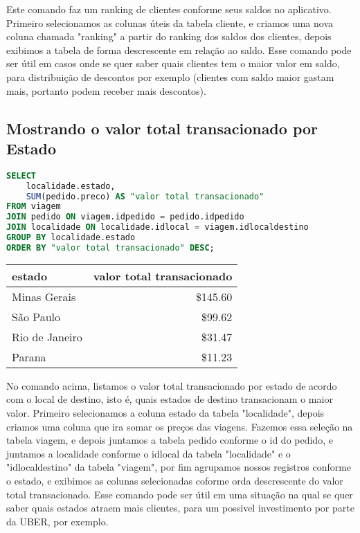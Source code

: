 \documentclass{article}
\begin{document}
Este comando faz um ranking de clientes conforme seus saldos no aplicativo. Primeiro selecionamos as colunas úteis da tabela cliente, e criamos uma nova coluna chamada "ranking" a partir do ranking dos saldos dos clientes, depois exibimos a tabela de forma descrescente em relação ao saldo. Esse comando pode ser útil em casos onde se quer saber quais clientes tem o maior valor em saldo, para distribuição de descontos por exemplo (clientes com saldo maior gastam mais, portanto podem receber mais descontos).

\break

\subsection{Mostrando o valor total transacionado por Estado}

\begin{lstlisting}[language=SQL]
SELECT 
    localidade.estado, 
    SUM(pedido.preco) AS "valor total transacionado"
FROM viagem
JOIN pedido ON viagem.idpedido = pedido.idpedido
JOIN localidade ON localidade.idlocal = viagem.idlocaldestino
GROUP BY localidade.estado
ORDER BY "valor total transacionado" DESC;
\end{lstlisting}

\begin{table}[h]
    \centering
    \begin{tabular}{l|r}
    
    \textbf{estado} & \textbf{valor total transacionado} \\
    \hline

    Minas Gerais    &                   \$145.60  \\
    São Paulo       &                   \$99.62   \\
    Rio de Janeiro  &                   \$31.47   \\
    Parana          &                   \$11.23 
    
\end{tabular}
\end{table}

No comando acima, listamos o valor total transacionado por estado de acordo com o local de destino, isto é, quais estados de destino transacionam o maior valor. Primeiro selecionamos a coluna estado da tabela "localidade", depois criamos uma coluna que ira somar os preços das viagens. Fazemos essa seleção na tabela viagem, e depois juntamos a tabela pedido conforme o id do pedido, e juntamos a localidade conforme o idlocal da tabela "localidade" e o "idlocaldestino" da tabela "viagem", por fim agrupamos nossos registros conforme o estado, e exibimos as colunas selecionadas coforme orda descrescente do valor total transacionado. Esse comando pode ser útil em uma situação na qual se quer saber quais estados atraem mais clientes, para um possivel investimento por parte da UBER, por exemplo.
\end{document}
